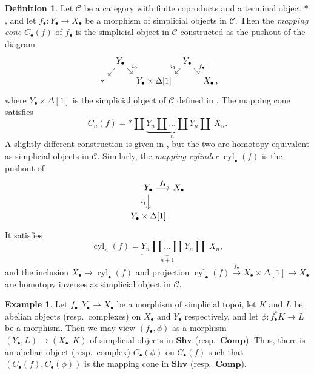 \documentclass[11pt]{amsart}
\theoremstyle{definition}
\newtheorem{Def}[Thm]{Definition}
\newtheorem{Ex}[Thm]{Example}
\newcommand{\cyl}{\operatorname{cyl}}
\newcommand{\SHV}{\mathbf{Shv}}
\newcommand{\COMP}{\mathbf{Comp}}
\newcommand{\punct}[1]{\makebox[0pt][l]{\,#1}} %
\begin{document}
\begin{Def}\label{Def simplicial cone}
Let $\mathscr C$ be a category with finite coproducts and a terminal
object $*$, and let $f_\bullet \colon Y_\bullet \to X_\bullet$ be a
morphism of simplicial objects in $\mathscr C$. Then the
\emph{mapping cone} $C_\bullet(f)$ of $f_\bullet$ is the simplicial
object in $\mathscr C$ constructed as the pushout of the diagram
\begin{equation*}
\begin{tikzcd}[column sep=.5em,row sep=.7em]
 & Y_\bullet\ar[end anchor=north east]{ld}\ar[end anchor=north west]{rd}{i_0} & & Y_\bullet\ar[end anchor=north east]{ld}[swap]{i_1}\ar[end anchor=north west]{rd}{f_\bullet} & \\
* & & Y_\bullet \times \Delta[1] & & X_\bullet\punct{,}
\end{tikzcd}
\end{equation*}
where $Y_\bullet \times \Delta[1]$ is the simplicial object of
$\mathscr C$ defined in \cite[Tag
\href{https://stacks.math.columbia.edu/tag/017C}{017C}]{Stacks}. The
mapping cone satisfies
\begin{equation}
C_n(f) = * \amalg \underbrace{Y_n \amalg \ldots \amalg Y_n}_n
\amalg\ X_n.\label{Eq mapping cone}
\end{equation}
A slightly different construction is given in \cite[6.3.1]{Hdg3},
but the two are homotopy equivalent as simplicial objects in
$\mathscr C$. Similarly, the \emph{mapping cylinder}
$\cyl_\bullet(f)$ is the pushout of
\begin{equation*}
\begin{tikzcd}[column sep=0em,row sep=1.7em]
Y_\bullet\ar{d}[swap]{i_1}\ar{r}{f_\bullet} & X_\bullet \\
Y_\bullet \times \Delta[1]\punct{.} &
\end{tikzcd}
\end{equation*}
It satisfies
\begin{equation}
\cyl_n(f) = \underbrace{Y_n \amalg \ldots \amalg Y_n}_{n+1} \amalg\
X_n,\label{Eq mapping cylinder}
\end{equation}
and the inclusion $X_\bullet \to \cyl_\bullet(f)$ and projection
$\cyl_\bullet(f) \stackrel{f_\bullet}\to X_\bullet \times \Delta[1]
\to X_\bullet$ are homotopy inverses as simplicial object in
$\mathscr C$.
\end{Def}

\begin{Ex}
Let $f_\bullet \colon Y_\bullet \to X_\bullet$ be a morphism of
simplicial topoi, let $K$ and $L$ be abelian objects
(resp.~complexes) on $X_\bullet$ and $Y_\bullet$ respectively, and
let $\phi \colon f_\bullet^* K \to L$ be a morphism. Then we may
view $(f_\bullet,\phi)$ as a morphism $(Y_\bullet,L) \to
(X_\bullet,K)$ of simplicial objects in $\SHV$ (resp.~$\COMP$).
Thus, there is an abelian object (resp.~complex) $C_\bullet(\phi)$
on $C_\bullet(f)$ such that $(C_\bullet(f),C_\bullet(\phi))$ is the
mapping cone in $\SHV$ (resp.~$\COMP$).
\end{Ex}
\end{document}
